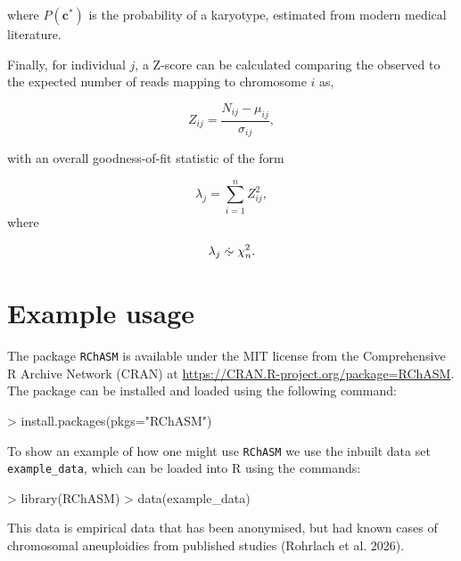 \documentclass[
  letterpaper,
  DIV=11,
  numbers=noendperiod]{scrartcl}
\newenvironment{Shaded}{\begin{snugshade}}{\end{snugshade}}
\newcommand{\AttributeTok}[1]{\textcolor[rgb]{0.40,0.45,0.13}{#1}}
\newcommand{\FunctionTok}[1]{\textcolor[rgb]{0.28,0.35,0.67}{#1}}
\newcommand{\NormalTok}[1]{\textcolor[rgb]{0.00,0.23,0.31}{#1}}
\newcommand{\SpecialCharTok}[1]{\textcolor[rgb]{0.37,0.37,0.37}{#1}}
\newcommand{\StringTok}[1]{\textcolor[rgb]{0.13,0.47,0.30}{#1}}
\begin{document}
where \(P\left(\boldsymbol{c}^* \right)\) is the probability of a
karyotype, estimated from modern medical literature.

Finally, for individual \(j\), a Z-score can be calculated comparing the
observed to the expected number of reads mapping to chromosome \(i\) as,

\[
    Z_{ij} = \dfrac{N_{ij}-\mu_{ij}}{\sigma_{ij}},
\]

with an overall goodness-of-fit statistic of the form

\[
    \lambda_{j} = \sum_{i=1}^{n} Z_{ij}^2,
\] where

\[
    \lambda_j %
  \mathrel{\ooalign{\hss$\sim$\hss\cr
                    \hidewidth\raise 0.65ex\hbox{$\cdot$}\hidewidth\cr
                    \hidewidth\lower 0.65ex\hbox{$\cdot$}\hidewidth}}%
\chi^2_{n}.
\]

\section{Example usage}\label{example-usage}

The package \texttt{RChASM} is available under the MIT license from the
Comprehensive R Archive Network (CRAN) at
\href{https://CRAN.R-project.org/package=RChASM}{https://CRAN.R-project.org/package=RChASM}.
The package can be installed and loaded using the following command:

\begin{Shaded}
\begin{Highlighting}[]
\SpecialCharTok{\textgreater{}} \FunctionTok{install.packages}\NormalTok{(}\AttributeTok{pkgs=}\StringTok{"RChASM"}\NormalTok{)}
\end{Highlighting}
\end{Shaded}

To show an example of how one might use \texttt{RChASM} we use the
inbuilt data set \texttt{example\_data}, which can be loaded into R
using the commands:

\begin{Shaded}
\begin{Highlighting}[]
\SpecialCharTok{\textgreater{}} \FunctionTok{library}\NormalTok{(RChASM)}
\SpecialCharTok{\textgreater{}} \FunctionTok{data}\NormalTok{(example\_data)}
\end{Highlighting}
\end{Shaded}

This data is empirical data that has been anonymised, but had known
cases of chromosomal aneuploidies from published studies (Rohrlach et
al. 2026).
\end{document}
